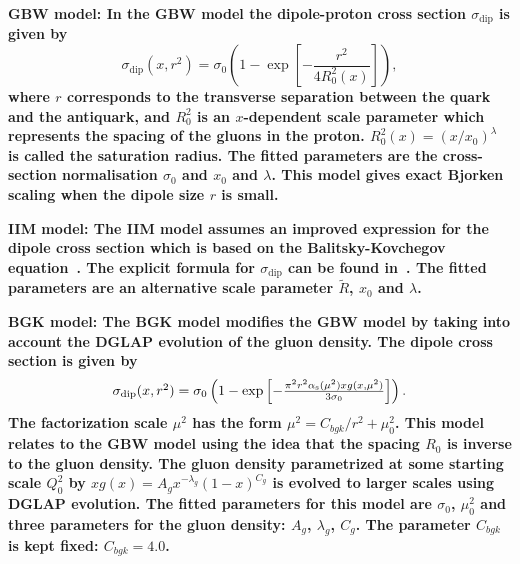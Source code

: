\begin{description}
\item \bf {GBW model:} \rm
In the GBW model the dipole-proton cross section $\sigma_{\text{dip}}$ is given by
\begin{equation}
\label{eGBW}
   \sigma_{\text{dip}}(x,r^{2}) = \sigma_{0} \left(1 - \exp \left[-\frac{r^{2}}{4R_{0}^{2}(x)} \right]\right),
\end{equation}
where $r$ corresponds to the transverse separation between the quark and the antiquark, and $R_{0}^{2}$
 is 
an $x$-dependent scale parameter which represents the spacing of the gluons in the proton. $R_{0}^{2}(x)=\left(x/x_{0}\right)^{\lambda}$ is called the saturation radius.
The fitted parameters are the cross-section normalisation $\sigma_{0}$ and $x_{0}$ and $\lambda$. This model gives exact Bjorken scaling when the dipole size $r$ is small.

\vspace{0.1cm}
\item \bf {IIM model:} \rm
The IIM model assumes an improved expression for the dipole cross section which is based on the 
Balitsky-Kovchegov equation~\cite{Balitsky:1995ub}. The explicit formula for $\sigma_{\text{dip}}$ 
can be found in~\cite{Iancu:2003ge}. The fitted parameters are an alternative scale parameter $\tilde{R}$, $x_{0}$ and $\lambda$.

\vspace{0.1cm}
\item \bf {BGK model:} \rm
The BGK model modifies the GBW model by taking into account the  DGLAP evolution
of the gluon density. 
The dipole cross section is given by
\begin{equation}
\begin{array}{lcl}
   \sigma_{\text{dip}}(x,r^{2})  =  \sigma_{0} 
\left(1 - \exp \left[-\frac{\pi^{2} r^{2} \alpha_\mathrm{s} (\mu^{2}) xg(x,\mu^{2})}{3 \sigma_{0}} \right]\right).
\end{array}
\label{eBGK}
\end{equation}
The factorization scale $\mu^{2}$ has the form $\mu^{2} = C_{bgk}/r^{2}+\mu^{2}_{0}$.
This model relates to the GBW model using the idea that the spacing $R_0$ is inverse to the gluon density.
The gluon density parametrized at some starting scale $Q_{0}^{2}$ by
$ xg(x) = A_{g} x^{-\lambda_{g}}(1-x)^{C_{g}} $
is evolved to larger scales using DGLAP evolution.
The fitted parameters for this model are $\sigma_{0}$, $\mu^{2}_{0}$ and three parameters for the gluon density: $A_{g}$, $\lambda_{g}$, $C_{g}$. The parameter $C_{bgk}$ is kept fixed: $C_{bgk} = 4.0$. 


\end{description}
